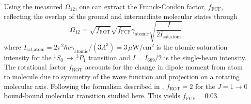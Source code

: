 Using the measured $\Omega_{12}$, one can extract the Franck-Condon factor, $f_{\text{FCF}}$, reflecting the overlap of the ground and intermediate molecular states through
\begin{equation}\label{Eq:FranckCondonRabiFrequency}
	\Omega_{12}=\sqrt{f_{\text{ROT}}}\sqrt{f_{\text{FCF}}}\gamma_{\text{atomic}}\sqrt{\frac{I}{2 I_{\text{sat,atom}}}}
\end{equation}
where $I_{\text{sat,atom}}=2\pi^2\hbar c \gamma_{\text{atomic}}/(3\Lambda^3)=3$\,$\mu$W/cm$^2$ is the atomic saturation intensity for the $^1S_0\,\rightarrow\,^3P_1$ transition and $I=I_{689}/2$ is the single-beam intensity.
The rotational factor $f_{\text{ROT}}$ accounts for the change in dipole moment from atom to molecule due to symmetry of the wave function and projection on a rotating molecular axis.
Following the formalism described in \cite{Pachomow2017a}, $f_{\text{ROT}}=2$ for the $J=1\rightarrow 0$ bound-bound molecular transition studied here.
This yields $f_{\text{FCF}} = 0.03$.

%
%


